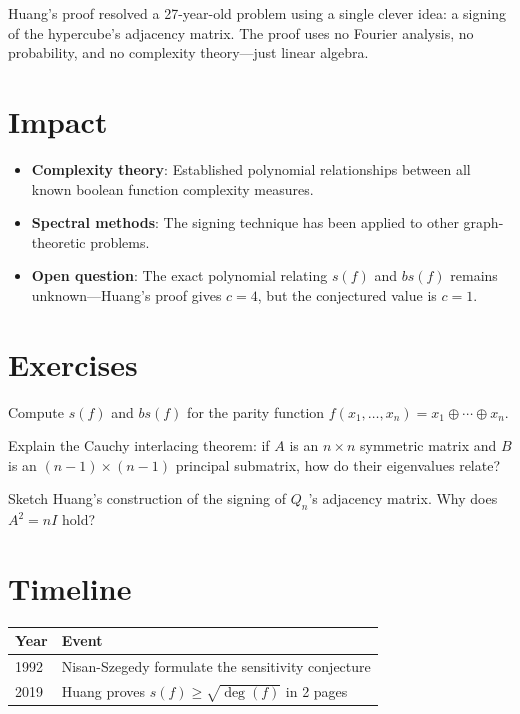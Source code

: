 \begin{highlightbox}
Huang's proof resolved a 27-year-old problem using a single clever idea: a signing of the hypercube's adjacency matrix. The proof uses no Fourier analysis, no probability, and no complexity theory---just linear algebra.
\end{highlightbox}

\section{Impact}
\begin{itemize}
\item \textbf{Complexity theory}: Established polynomial relationships between all known boolean function complexity measures.
\item \textbf{Spectral methods}: The signing technique has been applied to other graph-theoretic problems.
\item \textbf{Open question}: The exact polynomial relating $s(f)$ and $bs(f)$ remains unknown---Huang's proof gives $c = 4$, but the conjectured value is $c = 1$.
\end{itemize}

\section{Exercises}

\begin{exercise}[Basic]
Compute $s(f)$ and $bs(f)$ for the parity function $f(x_1, \ldots, x_n) = x_1 \oplus \cdots \oplus x_n$.
\end{exercise}

\begin{exercise}[Intermediate]
Explain the Cauchy interlacing theorem: if $A$ is an $n \times n$ symmetric matrix and $B$ is an $(n-1) \times (n-1)$ principal submatrix, how do their eigenvalues relate?
\end{exercise}

\begin{exercise}[Challenge]
Sketch Huang's construction of the signing of $Q_n$'s adjacency matrix. Why does $A^2 = nI$ hold?
\end{exercise}

\section{Timeline}

\begin{tabularx}{\linewidth}{lX}
\toprule
\textbf{Year} & \textbf{Event} \\ \midrule
1992 & Nisan-Szegedy formulate the sensitivity conjecture \\
2019 & Huang proves $s(f) \ge \sqrt{\deg(f)}$ in 2 pages \\
\bottomrule
\end{tabularx}

